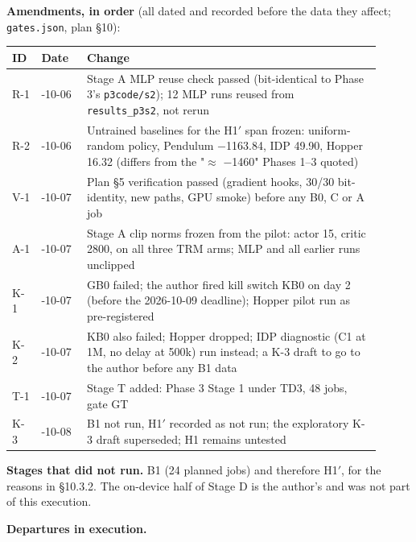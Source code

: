 \documentclass[11pt]{article}
\begin{document}
\textbf{Amendments, in order} (all dated and recorded before the data they affect; \texttt{gates.json}, plan \S{}10):



\begin{center}\small\begin{tabular}{>{\raggedright\arraybackslash}p{0.079\linewidth}>{\raggedright\arraybackslash}p{0.115\linewidth}>{\raggedright\arraybackslash}p{0.712\linewidth}}
\toprule
ID & Date & Change \\
\midrule
R-1 & 2026-10-06 & Stage A MLP reuse check passed (bit-identical to Phase 3's \texttt{p3code/s2}); 12 MLP runs reused from \texttt{results\_p3s2}, not rerun \\
R-2 & 2026-10-06 & Untrained baselines for the H1$'$ span frozen: uniform-random policy, Pendulum $-$1163.84, IDP 49.90, Hopper 16.32 (differs from the "$\approx$ $-$1460" Phases 1--3 quoted) \\
V-1 & 2026-10-07 & Plan \S{}5 verification passed (gradient hooks, 30/30 bit-identity, new paths, GPU smoke) before any B0, C or A job \\
A-1 & 2026-10-07 & Stage A clip norms frozen from the pilot: actor 15, critic 2800, on all three TRM arms; MLP and all earlier runs unclipped \\
K-1 & 2026-10-07 & GB0 failed; the author fired kill switch KB0 on day 2 (before the 2026-10-09 deadline); Hopper pilot run as pre-registered \\
K-2 & 2026-10-07 & KB0 also failed; Hopper dropped; IDP diagnostic (C1 at 1M, no delay at 500k) run instead; a K-3 draft to go to the author before any B1 data \\
T-1 & 2026-10-07 & Stage T added: Phase 3 Stage 1 under TD3, 48 jobs, gate GT \\
K-3 & 2026-10-08 & B1 not run, H1$'$ recorded as not run; the exploratory K-3 draft superseded; H1 remains untested \\
\bottomrule
\end{tabular}\end{center}



\textbf{Stages that did not run.} B1 (24 planned jobs) and therefore H1$'$, for the reasons in \S{}10.3.2. The on-device half of Stage D is the author's and was not part of this execution.



\textbf{Departures in execution.}
\end{document}
